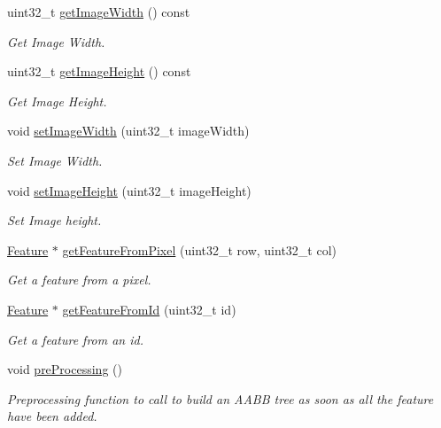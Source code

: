 \begin{DoxyCompactItemize}
uint32\+\_\+t \hyperlink{classfc_1_1FeatureCollection_a95ca2ce4b95b45a67b9cfec99cd686f2}{get\+Image\+Width} () const
\begin{DoxyCompactList}\small\item\em Get Image Width. \end{DoxyCompactList}\item 
uint32\+\_\+t \hyperlink{classfc_1_1FeatureCollection_a592c9d590dda0d84725ca48a0463143b}{get\+Image\+Height} () const
\begin{DoxyCompactList}\small\item\em Get Image Height. \end{DoxyCompactList}\item 
void \hyperlink{classfc_1_1FeatureCollection_a8442b318f388e4cd5dea8bbfc429c711}{set\+Image\+Width} (uint32\+\_\+t image\+Width)
\begin{DoxyCompactList}\small\item\em Set Image Width. \end{DoxyCompactList}\item 
void \hyperlink{classfc_1_1FeatureCollection_af187e8c3a7002a0f90a970c8c2166843}{set\+Image\+Height} (uint32\+\_\+t image\+Height)
\begin{DoxyCompactList}\small\item\em Set Image height. \end{DoxyCompactList}\item 
\hyperlink{classfc_1_1Feature}{Feature} $\ast$ \hyperlink{classfc_1_1FeatureCollection_a8b4f1f1b8e74be75c4a9da180d1d8e21}{get\+Feature\+From\+Pixel} (uint32\+\_\+t row, uint32\+\_\+t col)
\begin{DoxyCompactList}\small\item\em Get a feature from a pixel. \end{DoxyCompactList}\item 
\hyperlink{classfc_1_1Feature}{Feature} $\ast$ \hyperlink{classfc_1_1FeatureCollection_ae805790886eadef004168a2d7bd5dd07}{get\+Feature\+From\+Id} (uint32\+\_\+t id)
\begin{DoxyCompactList}\small\item\em Get a feature from an id. \end{DoxyCompactList}\item 
void \hyperlink{classfc_1_1FeatureCollection_ae2de0cf9672c5391f54b4882b86b57a2}{pre\+Processing} ()
\begin{DoxyCompactList}\small\item\em Preprocessing function to call to build an A\+A\+BB tree as soon as all the feature have been added. \end{DoxyCompactList}\item 

\end{DoxyCompactItemize}
